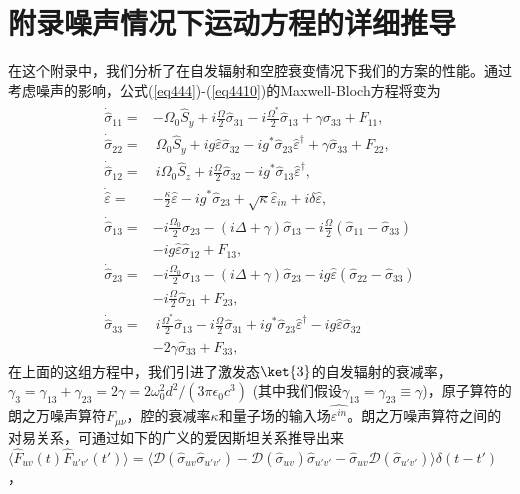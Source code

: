 \chapter[附录]{附录\quad 噪声情况下运动方程的详细推导}\label{appendix}
\vbox{}
\vbox{}
在这个附录中，我们分析了在自发辐射和空腔衰变情况下我们的方案的性能。通过考虑噪声的影响，公式(\ref{eq444})-(\ref{eq4410})的Maxwell-Bloch方程将变为\cite{PhysRevA.76.033804}
\begin{align} \label{a1}
	\begin{split}
		\dot {\hat \sigma}_{11}  =& -\Omega_0 \hat S_y + i   \frac \Omega2{ \hat \sigma}_{31} - i \frac{ \Omega^\ast}{2}{ \hat \sigma}_{13} + \gamma{ \hat \sigma}_{33}+ F_{11},\\
		\dot {\hat \sigma}_{22} =&~\Omega_0 \hat S_y + i g \hat \varepsilon{ \hat \sigma}_{32} - ig^\ast{ \hat \sigma}_{23} \hat \varepsilon^\dag + \gamma{ \hat \sigma}_{33}+ F_{22},\\
		\dot {\hat \sigma}_{12} =& ~ i  \Omega_0  \hat S_z + i   \frac{\Omega}{2}{ \hat \sigma}_{32} - ig^\ast{ \hat \sigma}_{13} \hat \varepsilon^\dag,\\
		\dot {\hat\varepsilon} =& - \frac\kappa2\hat\varepsilon - ig^\ast{\hat\sigma}_{23} + \sqrt\kappa{\hat\varepsilon}_{in}+i\delta\hat\varepsilon,\\
		\dot {\hat \sigma}_{13} =& -i\frac{ \Omega_0}2 \sigma_{23} - (i  \Delta + \gamma){ \hat \sigma}_{13}-i \frac\Omega2({ \hat \sigma}_{11}-{ \hat \sigma}_{33})\\
		&- ig\hat\varepsilon{\hat\sigma}_{12} + F_{13},\\
		\dot {\hat \sigma}_{23} =& -i\frac{ \Omega_0}2 \sigma_{13} - (i\Delta+\gamma){\hat\sigma}_{23} - ig\hat\varepsilon({\hat\sigma}_{22}-{\hat\sigma}_{33})\\
		&- i\frac\Omega2{\hat\sigma}_{21}+F_{23},\\
		\dot {\hat \sigma}_{33} =&~i\frac{\Omega^\ast}2{\hat\sigma}_{13} - i\frac\Omega2{\hat\sigma}_{31}+ig^\ast{\hat\sigma}_{23}\hat\varepsilon^\dag
		- ig\hat\varepsilon{\hat\sigma}_{32} \\
		&- 2\gamma{\hat\sigma}_{33}+F_{33},
	\end{split}
\end{align}
在上面的这组方程中，我们引进了激发态$\ket{3}$的自发辐射的衰减率，$\gamma_3=\gamma_{13}+\gamma_{23}=2\gamma=2\omega_0^2d^2/(3\pi\epsilon_0c^3)$ \cite{fox2006quantum} (其中我们假设$\gamma_{13}=\gamma_{23}\equiv \gamma$)，原子算符的朗之万噪声算符$F_{\mu\nu}$，腔的衰减率$\kappa$和量子场的输入场$\hat{\varepsilon^{in}}$。朗之万噪声算符之间的对易关系，可通过如下的广义的爱因斯坦关系\cite{PhysRevA.76.033804,JOB}推导出来$\langle \hat F_{uv}(t)\hat F_{u'v'}(t')\rangle=\langle\mathcal {D}(\hat\sigma_{uv}\hat\sigma_{u'v'})-\mathcal {D}(\hat\sigma_{uv})\hat\sigma_{u'v'}-\hat\sigma_{uv}\mathcal {D}(\hat\sigma_{u'v'})\rangle\delta(t-t')$，
